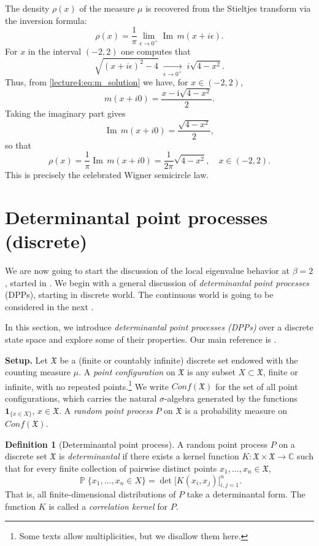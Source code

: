\documentclass[letterpaper,11pt,oneside,reqno]{book}
\numberwithin{equation}{chapter}  %
\theoremstyle{definition}
\newtheorem{definition}[proposition]{Definition}
\begin{document}
The density \(\rho(x)\) of the measure \(\mu\) is recovered from the Stieltjes transform via the inversion formula:
\[
\rho(x)=\frac{1}{\pi}\lim_{\epsilon\to0^+}\operatorname{Im}\,m(x+i\epsilon).
\]
For \(x\) in the interval \((-2,2)\) one computes that
\[
\sqrt{(x+i\epsilon)^2-4}\;\xrightarrow[\epsilon\to0^+]{}\; i\sqrt{4-x^2}.
\]
Thus, from \eqref{lecture4:eq:m_solution} we have, for \(x\in(-2,2)\),
\[
m(x+i0)=\frac{x-\mathrm{i}\sqrt{4-x^2}}{2}.
\]
Taking the imaginary part gives
\[
\operatorname{Im}\,m(x+i0)=\frac{\sqrt{4-x^2}}{2},
\]
so that
\[
\rho(x)=\frac{1}{\pi}\operatorname{Im}\,m(x+i0)=\frac{1}{2\pi}\sqrt{4-x^2},\quad x\in(-2,2).
\]
This is precisely the celebrated Wigner semicircle law.



\section{Determinantal point processes (discrete)}
\label{lecture4:sec:determinantal}

We are now going to start the discussion of the local eigenvalue
behavior at $\beta=2$, started in .
We begin with a general discussion of \emph{determinantal point processes} (DPPs),
starting in discrete world. The continuous world is going to be considered in the next
.

In this section, we introduce \emph{determinantal point processes (DPPs)}
over a discrete state space and explore some of their properties.
Our main reference is \cite{Borodin2009}.

\medskip

\noindent\textbf{Setup.} Let \(\mathfrak{X}\) be a (finite or countably infinite)
discrete set endowed with the counting measure \(\mu\).
A \emph{point configuration} on \(\mathfrak{X}\) is any subset \(X\subset \mathfrak{X}\),
finite or infinite, with no repeated points.\footnote{Some texts allow
multiplicities, but we disallow them here.}
We write \(Conf(\mathfrak{X})\) for the set of all point configurations,
which carries the natural \(\sigma\)-algebra generated by the functions
\(\mathbf{1}_{\{x\in X\}}\), \(x\in\mathfrak{X}\). A \emph{random point process} \(P\)
on \(\mathfrak{X}\) is a probability measure on \(Conf(\mathfrak{X})\).

\begin{definition}[Determinantal point process]
\label{lecture4:def:dpp-discrete}
A random point process \(P\) on a discrete set \(\mathfrak{X}\) is \emph{determinantal}
if there exists a kernel function \(K:\mathfrak{X}\times\mathfrak{X} \to \mathbb{C}\) such that
for every finite collection of pairwise distinct points \(x_1,\dots,x_n\in \mathfrak{X}\),
\begin{equation}
\label{lecture4:eq:DPP-def}
\operatorname{\mathbb{P}}\{x_1,\dots,x_n\in X\} = \det\bigl[K(x_i,x_j)\bigr]_{i,j=1}^n.
\end{equation}
That is, all finite-dimensional distributions of \(P\) take a determinantal form.
The function \(K\) is called a \emph{correlation kernel} for \(P\).
\end{definition}
\end{document}
